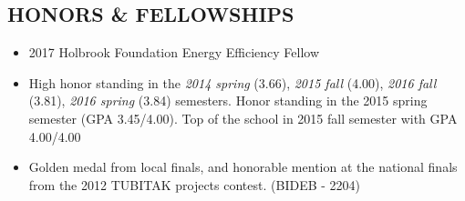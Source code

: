 \documentclass[line]{res}
\begin{document}
\begin{resume}
\section{HONORS \& FELLOWSHIPS} 
\begin{itemize}
    \item 2017 Holbrook Foundation Energy Efficiency Fellow
    \item High honor standing in the \textit{2014 spring} (3.66), \textit{2015 fall} (4.00), \textit{2016 fall} (3.81), \textit{2016 spring} (3.84) semesters. Honor standing in the 2015 spring semester (GPA 3.45/4.00). Top of the school in 2015 fall semester with GPA 4.00/4.00
    \item Golden medal from local finals, and honorable mention at the national finals from the 2012 TUBITAK projects contest. (BIDEB - 2204)
\end{itemize}
\end{resume}
\end{document}
